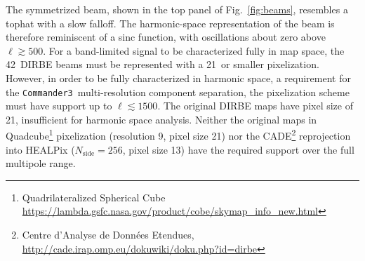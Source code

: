 \documentclass{aa}
\def\commanderthree{\texttt{Commander3}}
\begin{document}
The symmetrized beam, shown in the top panel of Fig.~\ref{fig:beams}, resembles a tophat with a slow falloff. The harmonic-space representation of the beam is therefore reminiscent of a sinc function, with oscillations about zero above $\ell\gtrsim500$. For a band-limited signal to be characterized fully in map space, the 42\arcm\ DIRBE beams must be represented with a 21\arcm\ or smaller pixelization. However, in order to be fully characterized in harmonic space, a requirement for the \commanderthree\ multi-resolution component separation, the pixelization scheme must have support up to $\ell\lesssim1500$. The original DIRBE maps have pixel size of 21\arcm, insufficient for harmonic space analysis.
Neither the original maps in Quadcube\footnote{
	Quadrilateralized Spherical Cube \url{https://lambda.gsfc.nasa.gov/product/cobe/skymap\_info\_new.html}
}
pixelization (resolution 9, pixel size 21\arcm) nor the CADE\footnote{Centre d'Analyse de Données Etendues, \url{http://cade.irap.omp.eu/dokuwiki/doku.php?id=dirbe}} reprojection into HEALPix ($N_\mathrm{side}=256$, pixel size 13) have the required support over the full multipole range. 
\end{document}
